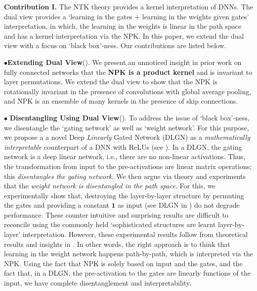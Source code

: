 \textbf{Contribution I.}  The NTK theory provides a kernel interpretation of DNNs. The dual view provides a `learning in the gates + learning in the weights given gates' interpretation, in which, the learning in the weights is linear in the path space and has a kernel interpretation via the NPK. In this paper, we extend the dual view with a focus on `black box'-ness. Our contributions are listed below.

$\bullet$\textbf{Extending Dual View}().  We present an unnoticed insight in prior work on fully connected networks that the \textbf{NPK is a product kernel} and is invariant to layer permutations. We extend the dual view to show that the NPK is rotationally invariant in the presence of convolutions with global average pooling, and NPK is an ensemble of many kernels in the presence of skip connections. 

$\bullet$ \textbf{Disentangling Using Dual View}(). To address the issue of `black box'-ness, we disentangle the `gating network' as well as `weight network'. For this purpose, we propose a a novel Deep \emph{Linearly} Gated Network (DLGN) as a \emph{mathematically interpretable} counterpart of a DNN with ReLUs (see ).  In a DLGN, the gating network is a deep linear network, i.e., there are no non-linear activations. Thus, the transformation from input to the pre-activations are linear matrix operations; this \emph{disentangles the gating network}. We then argue via theory and experiments that the  \emph{weight network is disentangled in the path space}. For this, we experimentally show that, destroying the layer-by-layer structure by permuting the gates and providing a constant $\mathbf{1}$ as input (see DLGN in ) do not  degrade performance. These counter intuitive and surprising results are difficult to reconcile using the commonly held `sophisticated structures are learnt layer-by-layer' interpretation. However, these experimental results follow from theoretical results and insights in .  In other words, the right approach is to think that learning in the weight network happens path-by-path, which is interpreted via the NPK. Using the fact that NPK is solely based on input and the gates, and the fact that, in a DLGN, the pre-activation to the gates are linearly functions of the input, we have complete disentanglement and interpretability.

